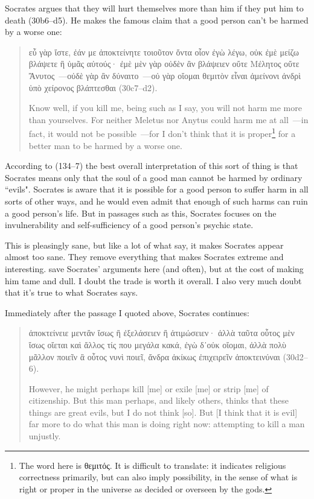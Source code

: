 \documentclass[11pt]{article}
\begin{document}
Socrates argues that they will hurt themselves more than him if they put him to death (30b6--d5).  He makes the famous claim that a good person can't be harmed by a worse one:

\begin{quote}
    {\g εὖ γὰρ ἴστε, ἐάν με ἀποκτείνητε τοιοῦτον ὄντα οἷον ἐγὼ λέγω, οὐκ ἐμὲ μείζω βλάψετε ἢ ὑμᾶς αὐτούς· ἐμὲ μὲν γὰρ οὐδὲν ἂν βλάψειεν οὔτε Μέλητος οὔτε Ἄνυτος~---οὐδὲ γὰρ ἂν δύναιτο~---οὐ γὰρ οἴομαι θεμιτὸν εἶναι ἀμείνονι ἀνδρὶ ὑπὸ χείρονος βλάπτεσθαι} (30c7--d2).

    Know well, if you kill me, being such as I say, you will not harm me more than yourselves. For neither Meletus nor Anytus could harm me at all~---in fact, it would not be possible~---for I don't think that it is proper\footnote{The word here is {\g θεμιτός}.  It is difficult to translate: it indicates religious correctness primarily, but can also imply possibility, in the sense of what is right or proper in the universe as decided or overseen by the gods.} for a better man to be harmed by a worse one.
\end{quote}

According to \citet{brickhouse2004} (134--7) the best overall interpretation of this sort of thing is that Socrates means only that the soul of a good man cannot be harmed by ordinary ``evils".  Socrates is aware that it is possible for a good person to suffer harm in all sorts of other ways, and he would even admit that enough of such harms can ruin a good person's life.  But in passages such as this, Socrates focuses on the invulnerability and self-sufficiency of a good person's psychic state.

This is pleasingly sane, but like a lot of what \citeauthor{brickhouse2004} say, it makes Socrates appear almost too sane.  They remove everything that makes Socrates extreme and interesting.  \citeauthor{brickhouse2004} save Socrates' arguments here (and often), but at the cost of making him tame and dull.  I doubt the trade is worth it overall.  I also very much doubt that it's true to what Socrates says.

Immediately after the passage I quoted above, Socrates continues:

\begin{quote}
    {\g ἀποκτείνειε μεντἂν ἴσως ἢ ἐξελάσειεν ἢ ἀτιμώσειεν· ἀλλὰ ταῦτα οὗτος μὲν ἴσως οἴεται καὶ ἄλλος τίς που μεγάλα κακά, ἐγὼ δ᾽οὐκ οἴομαι, ἀλλὰ πολὺ μᾶλλον ποιεῖν ἃ οὗτος νυνὶ ποιεῖ, ἄνδρα ἀκίκως ἐπιχειρεῖν ἀποκτεινύναι} (30d2--6).

    However, he might perhaps kill [me] or exile [me] or strip [me] of citizenship. But this man perhaps, and likely others, thinks that these things are great evils, but I do not think [so]. But [I think that it is evil] far more to do what this man is doing right now: attempting to kill a man unjustly.
\end{quote}
\end{document}
